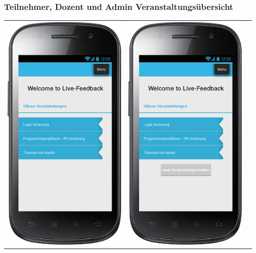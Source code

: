 \documentclass[german,a4paper]{beamer}
\begin{document}
\begin{frame}
\frametitle{Teilnehmer, Dozent und Admin Veranstaltungs\"{u}bersicht}
\begin{tabular}{ccc}
  \includegraphics[height=0.75\textheight]{./mockups/mockup_welcome_teilnehmer.png}
  &
  \includegraphics[height=0.75\textheight]{./mockups/mockup_welcome_dozent.png}

\end{tabular}
\end{frame}
\end{document}
